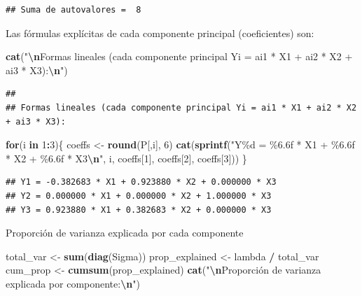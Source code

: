 \documentclass[
]{book}
\newenvironment{Shaded}{\begin{snugshade}}{\end{snugshade}}
\newcommand{\ControlFlowTok}[1]{\textcolor[rgb]{0.13,0.29,0.53}{\textbf{#1}}}
\newcommand{\DecValTok}[1]{\textcolor[rgb]{0.00,0.00,0.81}{#1}}
\newcommand{\FunctionTok}[1]{\textcolor[rgb]{0.13,0.29,0.53}{\textbf{#1}}}
\newcommand{\NormalTok}[1]{#1}
\newcommand{\OtherTok}[1]{\textcolor[rgb]{0.56,0.35,0.01}{#1}}
\newcommand{\SpecialCharTok}[1]{\textcolor[rgb]{0.81,0.36,0.00}{\textbf{#1}}}
\newcommand{\StringTok}[1]{\textcolor[rgb]{0.31,0.60,0.02}{#1}}
\begin{document}
\begin{verbatim}
## Suma de autovalores =  8
\end{verbatim}

Las fórmulas explícitas de cada componente principal (coeficientes) son:

\begin{Shaded}
\begin{Highlighting}[]
\FunctionTok{cat}\NormalTok{(}\StringTok{"}\SpecialCharTok{\textbackslash{}n}\StringTok{Formas lineales (cada componente principal Yi = ai1 * X1 + ai2 * X2 + ai3 * X3):}\SpecialCharTok{\textbackslash{}n}\StringTok{"}\NormalTok{)}
\end{Highlighting}
\end{Shaded}

\begin{verbatim}
## 
## Formas lineales (cada componente principal Yi = ai1 * X1 + ai2 * X2 + ai3 * X3):
\end{verbatim}

\begin{Shaded}
\begin{Highlighting}[]
\ControlFlowTok{for}\NormalTok{(i }\ControlFlowTok{in} \DecValTok{1}\SpecialCharTok{:}\DecValTok{3}\NormalTok{)\{}
\NormalTok{  coeffs }\OtherTok{\textless{}{-}} \FunctionTok{round}\NormalTok{(P[,i], }\DecValTok{6}\NormalTok{)}
  \FunctionTok{cat}\NormalTok{(}\FunctionTok{sprintf}\NormalTok{(}\StringTok{"Y\%d = \%6.6f * X1 + \%6.6f * X2 + \%6.6f * X3}\SpecialCharTok{\textbackslash{}n}\StringTok{"}\NormalTok{, i, coeffs[}\DecValTok{1}\NormalTok{], coeffs[}\DecValTok{2}\NormalTok{], coeffs[}\DecValTok{3}\NormalTok{]))}
\NormalTok{\}}
\end{Highlighting}
\end{Shaded}

\begin{verbatim}
## Y1 = -0.382683 * X1 + 0.923880 * X2 + 0.000000 * X3
## Y2 = 0.000000 * X1 + 0.000000 * X2 + 1.000000 * X3
## Y3 = 0.923880 * X1 + 0.382683 * X2 + 0.000000 * X3
\end{verbatim}

Proporción de varianza explicada por cada componente

\begin{Shaded}
\begin{Highlighting}[]
\NormalTok{total\_var }\OtherTok{\textless{}{-}} \FunctionTok{sum}\NormalTok{(}\FunctionTok{diag}\NormalTok{(Sigma))}
\NormalTok{prop\_explained }\OtherTok{\textless{}{-}}\NormalTok{ lambda }\SpecialCharTok{/}\NormalTok{ total\_var}
\NormalTok{cum\_prop }\OtherTok{\textless{}{-}} \FunctionTok{cumsum}\NormalTok{(prop\_explained)}
\FunctionTok{cat}\NormalTok{(}\StringTok{"}\SpecialCharTok{\textbackslash{}n}\StringTok{Proporción de varianza explicada por componente:}\SpecialCharTok{\textbackslash{}n}\StringTok{"}\NormalTok{)}
\end{Highlighting}
\end{Shaded}
\end{document}

